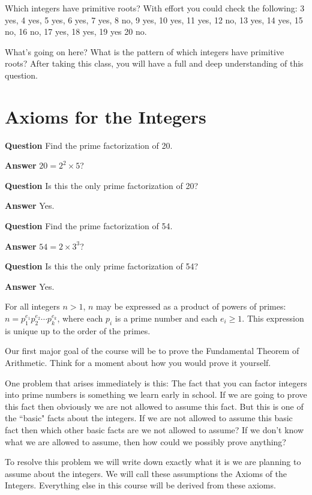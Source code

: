 \documentclass[oneside,12pt]{amsart}
\begin{document}
Which integers have primitive roots? With effort you could check the following:
3 yes, 4 yes, 5 yes, 6 yes, 7 yes, 8 no, 9 yes, 10 yes, 11 yes, 12 no, 13 yes, 14 yes, 15 no,
16 no, 17 yes, 18 yes, 19 yes 20 no.

What's going on here? What is the pattern of which integers have primitive roots? After taking
 this
class, you will have a full and deep understanding of this question.

\section{Axioms for the Integers}

\textbf{Question} Find the prime factorization of 20.

\textbf{Answer} $20=2^2 \times 5$?

\textbf{Question} Is this the only prime factorization of 20?

\textbf{Answer} Yes.

\textbf{Question} Find the prime factorization of 54.

\textbf{Answer} $54=2\times 3^3$?

\textbf{Question} Is this the only prime factorization of 54?

\textbf{Answer} Yes.

\begin{theorem} For all integers $n>1$, $n$ may be expressed
as a product of powers of primes: $n=p_1^{e_1}p_2^{e_2}\cdots p_k^{e_k}$, where each
$p_i$ is a prime number and each $e_i\geq 1$. This expression is unique up to the order of
the primes.
\end{theorem}

Our first major goal of the course will be to prove the Fundamental Theorem of Arithmetic. Think
for a moment about how you would prove it yourself.

One problem that arises immediately is this: The fact that you can factor integers into prime numbers is something we learn
early in school. If we are going to prove this fact then obviously we are not allowed to assume this fact. But this is
one of the ``basic" facts about the integers. If we are not allowed to assume this basic fact then which other basic facts
are we not allowed to assume? If we don't know what we are allowed to assume, then how could we possibly prove anything?

To resolve this problem we will write down exactly what it is we are planning to assume about the integers. We will call these assumptions the Axioms of the Integers. Everything else in
this course will be derived from these axioms.
\end{document}
